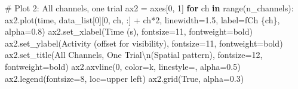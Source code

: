 \documentclass[
  11pt,
  letterpaper,
  oneside,
  openany]{book}
\newenvironment{Shaded}{\begin{snugshade}}{\end{snugshade}}
\newcommand{\BuiltInTok}[1]{\textcolor[rgb]{0.00,0.23,0.31}{#1}}
\newcommand{\CharTok}[1]{\textcolor[rgb]{0.13,0.47,0.30}{#1}}
\newcommand{\CommentTok}[1]{\textcolor[rgb]{0.37,0.37,0.37}{#1}}
\newcommand{\ControlFlowTok}[1]{\textcolor[rgb]{0.00,0.23,0.31}{\textbf{#1}}}
\newcommand{\DecValTok}[1]{\textcolor[rgb]{0.68,0.00,0.00}{#1}}
\newcommand{\FloatTok}[1]{\textcolor[rgb]{0.68,0.00,0.00}{#1}}
\newcommand{\KeywordTok}[1]{\textcolor[rgb]{0.00,0.23,0.31}{\textbf{#1}}}
\newcommand{\NormalTok}[1]{\textcolor[rgb]{0.00,0.23,0.31}{#1}}
\newcommand{\OperatorTok}[1]{\textcolor[rgb]{0.37,0.37,0.37}{#1}}
\newcommand{\SpecialCharTok}[1]{\textcolor[rgb]{0.37,0.37,0.37}{#1}}
\newcommand{\SpecialStringTok}[1]{\textcolor[rgb]{0.13,0.47,0.30}{#1}}
\newcommand{\StringTok}[1]{\textcolor[rgb]{0.13,0.47,0.30}{#1}}
\newcommand{\VariableTok}[1]{\textcolor[rgb]{0.07,0.07,0.07}{#1}}
\begin{document}
\begin{Shaded}
\begin{Highlighting}[]
\CommentTok{\# Plot 2: All channels, one trial}
\NormalTok{ax2 }\OperatorTok{=}\NormalTok{ axes[}\DecValTok{0}\NormalTok{, }\DecValTok{1}\NormalTok{]}
\ControlFlowTok{for}\NormalTok{ ch }\KeywordTok{in} \BuiltInTok{range}\NormalTok{(n\_channels):}
\NormalTok{    ax2.plot(time, data\_list[}\DecValTok{0}\NormalTok{][}\DecValTok{0}\NormalTok{, ch, :] }\OperatorTok{+}\NormalTok{ ch}\OperatorTok{*}\DecValTok{2}\NormalTok{, linewidth}\OperatorTok{=}\FloatTok{1.5}\NormalTok{, }
\NormalTok{             label}\OperatorTok{=}\SpecialStringTok{f\textquotesingle{}Ch }\SpecialCharTok{\{}\NormalTok{ch}\SpecialCharTok{\}}\SpecialStringTok{\textquotesingle{}}\NormalTok{, alpha}\OperatorTok{=}\FloatTok{0.8}\NormalTok{)}
\NormalTok{ax2.set\_xlabel(}\StringTok{\textquotesingle{}Time (s)\textquotesingle{}}\NormalTok{, fontsize}\OperatorTok{=}\DecValTok{11}\NormalTok{, fontweight}\OperatorTok{=}\StringTok{\textquotesingle{}bold\textquotesingle{}}\NormalTok{)}
\NormalTok{ax2.set\_ylabel(}\StringTok{\textquotesingle{}Activity (offset for visibility)\textquotesingle{}}\NormalTok{, fontsize}\OperatorTok{=}\DecValTok{11}\NormalTok{, fontweight}\OperatorTok{=}\StringTok{\textquotesingle{}bold\textquotesingle{}}\NormalTok{)}
\NormalTok{ax2.set\_title(}\StringTok{\textquotesingle{}All Channels, One Trial}\CharTok{\textbackslash{}n}\StringTok{(Spatial pattern)\textquotesingle{}}\NormalTok{, fontsize}\OperatorTok{=}\DecValTok{12}\NormalTok{, fontweight}\OperatorTok{=}\StringTok{\textquotesingle{}bold\textquotesingle{}}\NormalTok{)}
\NormalTok{ax2.axvline(}\DecValTok{0}\NormalTok{, color}\OperatorTok{=}\StringTok{\textquotesingle{}k\textquotesingle{}}\NormalTok{, linestyle}\OperatorTok{=}\StringTok{\textquotesingle{}{-}{-}\textquotesingle{}}\NormalTok{, alpha}\OperatorTok{=}\FloatTok{0.5}\NormalTok{)}
\NormalTok{ax2.legend(fontsize}\OperatorTok{=}\DecValTok{8}\NormalTok{, loc}\OperatorTok{=}\StringTok{\textquotesingle{}upper left\textquotesingle{}}\NormalTok{)}
\NormalTok{ax2.grid(}\VariableTok{True}\NormalTok{, alpha}\OperatorTok{=}\FloatTok{0.3}\NormalTok{)}


\end{Highlighting}
\end{Shaded}
\end{document}
